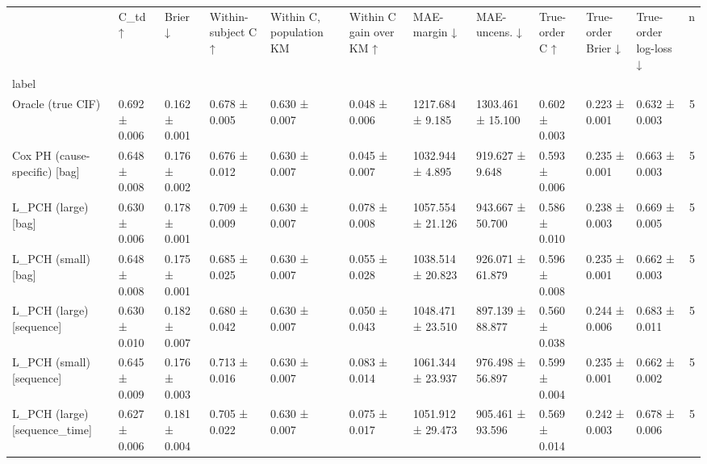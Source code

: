 \begin{tabular}{lllllllllllr}
\toprule
 & C\_td ↑ & Brier ↓ & Within-subject C ↑ & Within C, population KM & Within C gain over KM ↑ & MAE-margin ↓ & MAE-uncens. ↓ & True-order C ↑ & True-order Brier ↓ & True-order log-loss ↓ & n \\
label &  &  &  &  &  &  &  &  &  &  &  \\
\midrule
Oracle (true CIF) & 0.692 ± 0.006 & 0.162 ± 0.001 & 0.678 ± 0.005 & 0.630 ± 0.007 & 0.048 ± 0.006 & 1217.684 ± 9.185 & 1303.461 ± 15.100 & 0.602 ± 0.003 & 0.223 ± 0.001 & 0.632 ± 0.003 & 5 \\
Cox PH (cause-specific) [bag] & 0.648 ± 0.008 & 0.176 ± 0.002 & 0.676 ± 0.012 & 0.630 ± 0.007 & 0.045 ± 0.007 & 1032.944 ± 4.895 & 919.627 ± 9.648 & 0.593 ± 0.006 & 0.235 ± 0.001 & 0.663 ± 0.003 & 5 \\
L\_PCH (large) [bag] & 0.630 ± 0.006 & 0.178 ± 0.001 & 0.709 ± 0.009 & 0.630 ± 0.007 & 0.078 ± 0.008 & 1057.554 ± 21.126 & 943.667 ± 50.700 & 0.586 ± 0.010 & 0.238 ± 0.003 & 0.669 ± 0.005 & 5 \\
L\_PCH (small) [bag] & 0.648 ± 0.008 & 0.175 ± 0.001 & 0.685 ± 0.025 & 0.630 ± 0.007 & 0.055 ± 0.028 & 1038.514 ± 20.823 & 926.071 ± 61.879 & 0.596 ± 0.008 & 0.235 ± 0.001 & 0.662 ± 0.003 & 5 \\
L\_PCH (large) [sequence] & 0.630 ± 0.010 & 0.182 ± 0.007 & 0.680 ± 0.042 & 0.630 ± 0.007 & 0.050 ± 0.043 & 1048.471 ± 23.510 & 897.139 ± 88.877 & 0.560 ± 0.038 & 0.244 ± 0.006 & 0.683 ± 0.011 & 5 \\
L\_PCH (small) [sequence] & 0.645 ± 0.009 & 0.176 ± 0.003 & 0.713 ± 0.016 & 0.630 ± 0.007 & 0.083 ± 0.014 & 1061.344 ± 23.937 & 976.498 ± 56.897 & 0.599 ± 0.004 & 0.235 ± 0.001 & 0.662 ± 0.002 & 5 \\
L\_PCH (large) [sequence\_time] & 0.627 ± 0.006 & 0.181 ± 0.004 & 0.705 ± 0.022 & 0.630 ± 0.007 & 0.075 ± 0.017 & 1051.912 ± 29.473 & 905.461 ± 93.596 & 0.569 ± 0.014 & 0.242 ± 0.003 & 0.678 ± 0.006 & 5 \\
\bottomrule
\end{tabular}
